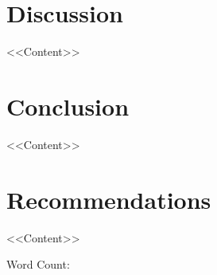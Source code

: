 \documentclass[british,12pt,a4paper]{article}
\begin{document}
	\section{Discussion}
	<<Content>>
	\section{Conclusion}
	<<Content>>
	\section{Recommendations}
	<<Content>>
	\vfill
	\begin{center}
		\large Word Count: 
	\end{center}
	\pagebreak
	\doublespacing
	\printbibliography
	
\end{document}
